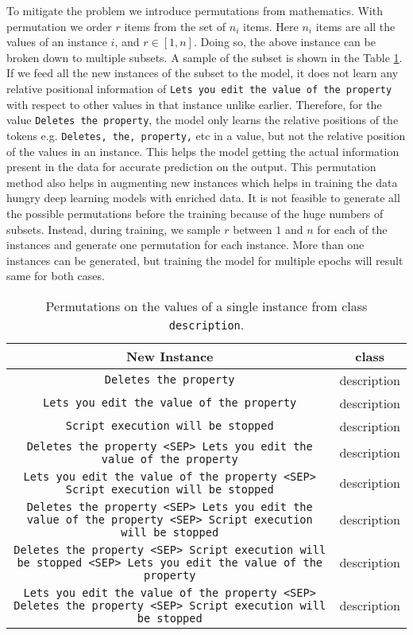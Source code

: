 \documentclass{article}
\begin{document}
To mitigate the problem we introduce permutations from mathematics. With permutation we order $r$ items from the set of $n_i$ items. Here $n_i$ items are all the values of an instance $i$, and $r \in [1, n]$. Doing so, the above instance can be broken down to multiple subsets. A sample of the subset is shown in the Table \ref{tab:permutation}. If we feed all the new instances of the subset to the model, it does not learn any relative positional information of \texttt{Lets you edit the value of the property} with respect to other values in that instance unlike earlier. Therefore, for the value \texttt{Deletes the property}, the model only learns the relative positions of the tokens e.g. \texttt{Deletes, the, property,} etc in a value, but not the relative position of the values in an instance. This helps the model getting the actual information present in the data for accurate prediction on the output. This permutation method also helps in augmenting new instances which helps in training the data hungry deep learning models with enriched data. It is not feasible to generate all the possible permutations before the training because of the huge numbers of subsets. Instead, during training, we sample $r$ between $1$ and $n$ for each of the instances and generate one permutation for each instance. More than one instances can be generated, but training the model for multiple epochs will result same for both cases.


\begin{table}[ht]
	\centering
	\begin{adjustbox}{width=\columnwidth,center}
	\begin{tabular}{cc}
		\hline
		\textbf{New Instance} & \textbf{class} \\ \hline
		\texttt{Deletes the property} & description \\ 
		\texttt{Lets you edit the value of the property} & description \\ 
		\texttt{Script execution will be stopped} & description \\ 
		\texttt{Deletes the property <SEP> Lets you edit the value of the property} & description \\ 
		\texttt{Lets you edit the value of the property <SEP> Script execution will be stopped} & description \\ 
		\texttt{Deletes the property <SEP> Lets you edit the value of the property <SEP> Script execution will be stopped} & description \\ 
		\texttt{Deletes the property <SEP> Script execution will be stopped <SEP> Lets you edit the value of the property} & description \\ 
		\texttt{Lets you edit the value of the property <SEP> Deletes the property <SEP> Script execution will be stopped} & description \\ \hline
		
	\end{tabular}
\end{adjustbox}
	\caption{Permutations on the values of a single instance from class \texttt{description}.}
	\label{tab:permutation}
\end{table}
\end{document}
